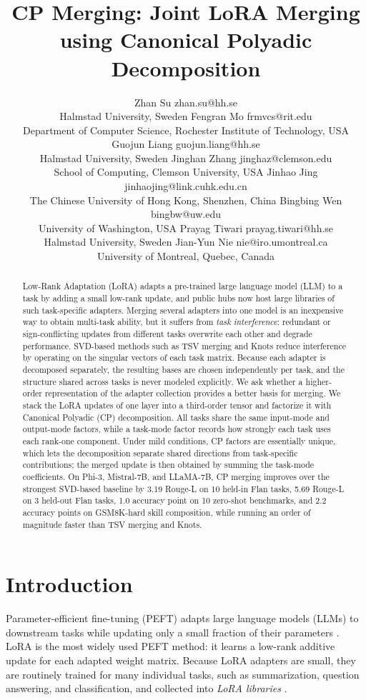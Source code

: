 \documentclass[10pt]{article} %
\title{CP Merging: Joint LoRA Merging using Canonical Polyadic Decomposition}
\author{\name Zhan Su \email zhan.su@hh.se \\
      \addr Halmstad University, Sweden 
      \AND 
      \name Fengran Mo \email frmvcs@rit.edu \\
      \addr Department of Computer Science, Rochester Institute of Technology, USA
      \AND
      \name Guojun Liang \email guojun.liang@hh.se \\
      \addr Halmstad University, Sweden
      \AND
      \name Jinghan Zhang \email jinghaz@clemson.edu \\
      \addr School of Computing, Clemson University, USA
      \AND
      \name Jinhao Jing \email 
      jinhaojing@link.cuhk.edu.cn \\
      \addr The Chinese University of Hong Kong, Shenzhen, China
      \AND 
      \name Bingbing Wen \email bingbw@uw.edu \\
      \addr University of Washington, USA
      \AND
      \name Prayag Tiwari \email prayag.tiwari@hh.se \\
      \addr Halmstad University, Sweden 
      \AND
      \name Jian-Yun Nie \email nie@iro.umontreal.ca \\
    \addr
    University of Montreal, Quebec, Canada 
}
\begin{document}
\maketitle

\begin{abstract}

Low-Rank Adaptation (LoRA) adapts a pre-trained large language model (LLM) to a task by adding a small low-rank update, and public hubs now host large libraries of such task-specific adapters. Merging several adapters into one model is an inexpensive way to obtain multi-task ability, but it suffers from \textit{task interference}: redundant or sign-conflicting updates from different tasks overwrite each other and degrade performance. SVD-based methods such as TSV merging and Knots reduce interference by operating on the singular vectors of each task matrix. Because each adapter is decomposed separately, the resulting bases are chosen independently per task, and the structure shared across tasks is never modeled explicitly. We ask whether a higher-order representation of the adapter collection provides a better basis for merging. We stack the LoRA updates of one layer into a third-order tensor and factorize it with Canonical Polyadic (CP) decomposition. All tasks share the same input-mode and output-mode factors, while a task-mode factor records how strongly each task uses each rank-one component. Under mild conditions, CP factors are essentially unique, which lets the decomposition separate shared directions from task-specific contributions; the merged update is then obtained by summing the task-mode coefficients. On Phi-3, Mistral-7B, and LLaMA-7B, CP merging improves over the strongest SVD-based baseline by 3.19 Rouge-L on 10 held-in Flan tasks, 5.69 Rouge-L on 3 held-out Flan tasks, 1.0 accuracy point on 10 zero-shot benchmarks, and 2.2 accuracy points on GSM8K-hard skill composition, while running an order of magnitude faster than TSV merging and Knots.

\end{abstract}

\section{Introduction}

    Parameter-efficient fine-tuning (PEFT) adapts large language models (LLMs)
    to downstream tasks while updating only a small fraction of their parameters
    \citep{hu2021lora,houlsby2019parameter,lester2021power}.
    LoRA \citep{hu2021lora} is the most widely used PEFT method: it learns a
    low-rank additive update for each adapted weight matrix. Because LoRA
    adapters are small, they are routinely trained for many individual tasks,
    such as summarization, question answering, and classification, and collected
    into \textit{LoRA libraries} \citep{sheng2023s,ostapenko2024towards,huang2023lorahub,su2024mixture,page2023multi}.
\end{document}
